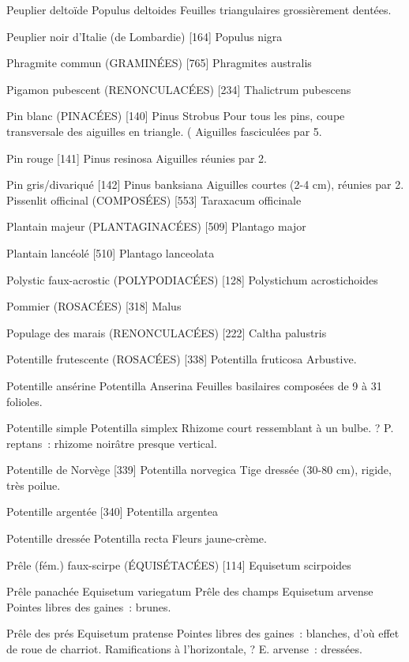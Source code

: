 Peuplier deltoïde
				Populus deltoides
Feuilles triangulaires grossièrement dentées.

Peuplier noir d’Italie (de Lombardie)  [164]
				Populus nigra

Phragmite commun (GRAMINÉES)  [765]
				Phragmites australis

Pigamon pubescent (RENONCULACÉES)  [234]
				Thalictrum pubescens

Pin blanc (PINACÉES)  [140]
				Pinus Strobus
Pour tous les pins, coupe transversale des aiguilles en triangle. (
Aiguilles fasciculées par 5.

Pin rouge  [141]
				Pinus resinosa
Aiguilles réunies par 2.

Pin gris/divariqué  [142]
				Pinus banksiana
Aiguilles courtes (2-4 cm), réunies par 2.
Pissenlit officinal (COMPOSÉES)  [553]
				Taraxacum officinale

Plantain majeur (PLANTAGINACÉES)  [509]
				Plantago major

Plantain lancéolé  [510]
				Plantago lanceolata

Polystic faux-acrostic (POLYPODIACÉES)  [128]
				Polystichum acrostichoides

Pommier (ROSACÉES)  [318]
				Malus

Populage des marais (RENONCULACÉES)  [222]
				Caltha palustris

Potentille frutescente (ROSACÉES)  [338]
				Potentilla fruticosa
Arbustive.



Potentille ansérine
				Potentilla Anserina
Feuilles basilaires composées de 9 à 31 folioles.

Potentille simple
				Potentilla simplex
Rhizome court ressemblant à un bulbe.
? P. reptans : rhizome noirâtre presque vertical.

Potentille de Norvège  [339]
				Potentilla norvegica
Tige dressée (30-80 cm), rigide, très poilue.

Potentille argentée  [340]
				Potentilla argentea

Potentille dressée
				Potentilla recta
Fleurs jaune-crème.

Prêle (fém.) faux-scirpe (ÉQUISÉTACÉES) [114]
				Equisetum scirpoides

Prêle panachée
				Equisetum variegatum
Prêle des champs
				Equisetum arvense
Pointes libres des gaines : brunes.

Prêle des prés
				Equisetum pratense
Pointes libres des gaines : blanches, d’où effet de roue de charriot.
Ramifications à l’horizontale, ? E. arvense : dressées.

